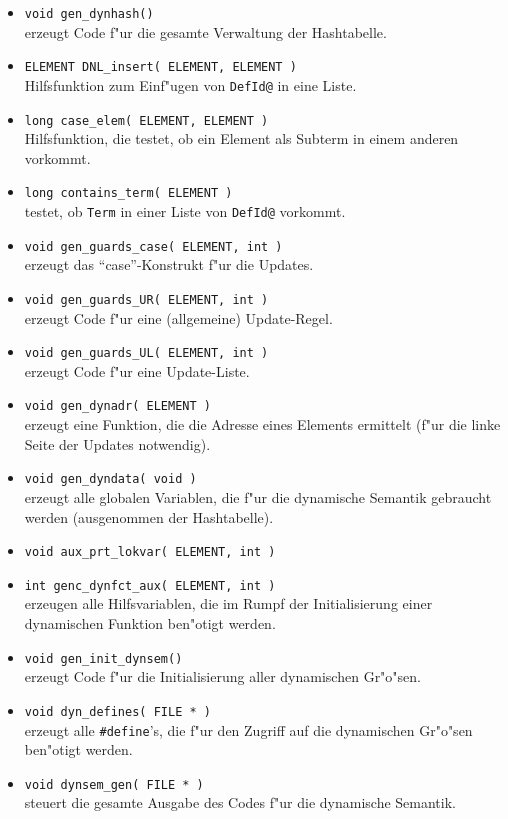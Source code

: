 \begin{itemize}
\item {\tt void gen\_dynhash()}\\
erzeugt Code f"ur die gesamte Verwaltung der Hashtabelle.

\item {\tt ELEMENT DNL\_insert( ELEMENT, ELEMENT )}\\
Hilfsfunktion zum Einf"ugen von {\tt DefId@} in eine Liste.

\item {\tt long case\_elem( ELEMENT, ELEMENT )}\\
Hilfsfunktion, die testet, ob ein Element als Subterm
in einem anderen vorkommt.

\item {\tt long contains\_term( ELEMENT )}\\
testet, ob {\tt Term} in einer Liste von {\tt DefId@} vorkommt.

\item {\tt void gen\_guards\_case( ELEMENT, int )}\\
erzeugt das "`case"'-Konstrukt f"ur die Updates.

\item {\tt void gen\_guards\_UR( ELEMENT, int )}\\
erzeugt Code f"ur eine (allgemeine) Update-Regel.

\item {\tt void gen\_guards\_UL( ELEMENT, int )}\\
erzeugt Code f"ur eine Update-Liste.

\item {\tt void gen\_dynadr( ELEMENT )}\\
erzeugt eine Funktion, die die Adresse eines Elements ermittelt (f"ur
die linke Seite der Updates notwendig).

\item {\tt void gen\_dyndata( void )}\\
erzeugt alle globalen Variablen, die f"ur die dynamische Semantik
gebraucht werden (ausgenommen der Hashtabelle).

\item {\tt void aux\_prt\_lokvar( ELEMENT, int )}
\item {\tt int genc\_dynfct\_aux( ELEMENT, int )}\\
erzeugen alle Hilfsvariablen, die im Rumpf der Initialisierung
einer dynamischen Funktion ben"otigt werden.

\item {\tt void gen\_init\_dynsem()}\\
erzeugt Code f"ur die Initialisierung aller dynamischen Gr"o"sen.

\item {\tt void dyn\_defines( FILE * )}\\
erzeugt alle {\tt \#define}'s, die f"ur den Zugriff auf die dynamischen
Gr"o"sen ben"otigt werden.

\item {\tt void dynsem\_gen( FILE * )}\\
steuert die gesamte Ausgabe des Codes f"ur die dynamische Semantik.
\end{itemize}

